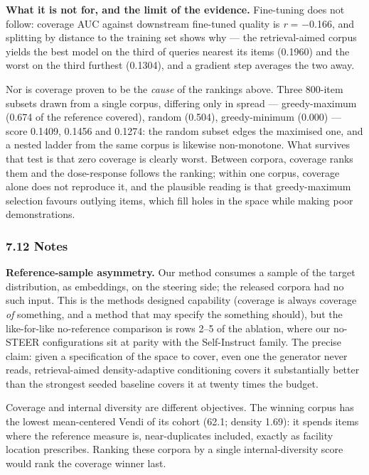 \documentclass[
  10pt,
]{article}
\theoremstyle{plain}
\theoremstyle{definition}
\begin{document}
\textbf{What it is not for, and the limit of the evidence.} Fine-tuning
does not follow: coverage AUC against downstream fine-tuned quality is
\emph{r} = −0.166, and splitting by distance to the training set shows
why --- the retrieval-aimed corpus yields the best model on the third of
queries nearest its items (0.1960) and the worst on the third furthest
(0.1304), and a gradient step averages the two away.

Nor is coverage proven to be the \emph{cause} of the rankings above.
Three 800-item subsets drawn from a single corpus, differing only in
spread --- greedy-maximum (0.674 of the reference covered), random
(0.504), greedy-minimum (0.000) --- score 0.1409, 0.1456 and 0.1274: the
random subset edges the maximised one, and a nested ladder from the same
corpus is likewise non-monotone. What survives that test is that zero
coverage is clearly worst. Between corpora, coverage ranks them and the
dose-response follows the ranking; within one corpus, coverage alone
does not reproduce it, and the plausible reading is that greedy-maximum
selection favours outlying items, which fill holes in the space while
making poor demonstrations.

\subsubsection{7.12 Notes}\label{712-notes}

\textbf{Reference-sample asymmetry.} Our method consumes a sample of the
target distribution, as embeddings, on the steering side; the released
corpora had no such input. This is the method\textquotesingle s designed
capability (coverage is always coverage \emph{of} something, and a
method that may specify the something should), but the like-for-like
no-reference comparison is rows 2--5 of the ablation, where our no-STEER
configurations sit at parity with the Self-Instruct family. The precise
claim: given a specification of the space to cover, even one the
generator never reads, retrieval-aimed density-adaptive conditioning
covers it substantially better than the strongest seeded baseline covers
it at twenty times the budget.

Coverage and internal diversity are different objectives. The winning
corpus has the lowest mean-centered Vendi of its cohort (62.1; density
1.69): it spends items where the reference measure is, near-duplicates
included, exactly as facility location prescribes. Ranking these corpora
by a single internal-diversity score would rank the coverage winner
last.
\end{document}
